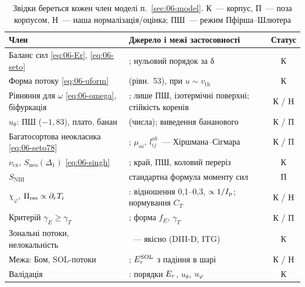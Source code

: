 \begin{table}[ht]
\centering\small
\caption{Звідки береться кожен член моделі п.~\ref{sec:06-model}. К~--- корпус, П~--- поза корпусом, Н~--- наша нормалізація/оцінка; ПШ~--- режим Пфірша--Шлютера}\label{tab:06-model}
\begin{tabularx}{\textwidth}{@{}p{4.1cm}Xc@{}}
\toprule
Член & Джерело і межі застосовності & Статус\\
\midrule
Баланс сил \eqref{eq:06-Er}, \eqref{eq:06-seto} & \cite{Seto2014,Singh2004,Ida2001}; нульовий порядок за δ & К\\
Форма потоку \eqref{eq:06-uform} & \cite{Seto2014} (рівн.~53), \cite{Sigmar1987} при $u\sim v_{\mathrm{th}}$ & К\\
Рівняння для $\omega$ \eqref{eq:06-omega}, біфуркація & \cite{Sigmar1987}; лише ПШ, ізотермічні поверхні; стійкість коренів & К / Н\\
$u_\theta$: ПШ ($-1{,}83$), плато, банан & \cite{Singh2004} (числа); виведення бананового & К / П\\
Багатосортова неокласика \eqref{eq:06-seto78} & \cite{Seto2014}; $\mu_{ai}$, $l^{ab}_{ij}$~--- Хіршмана--Сігмара & К / П\\
$\nu_{\mathrm{cx}}$, $S_{\mathrm{neo}}(\Delta_1)$ \eqref{eq:06-singh} & \cite{Singh2004}; край, ПШ, коловий переріз & К\\
$S_{\mathrm{NBI}}$ & стандартна формула моменту сил & П\\
$\chi_{\varphi}$, $\Pi_{\mathrm{res}}\propto\partial_rT_i$ & \cite{Ida2001}: відношення 0,1--0,3, $\propto1/I_{\mathrm{p}}$; нормування $C_T$ & К / Н\\
Критерій $\gamma_E\ge\gamma_T$ & \cite{Singh2004,Ida2001}; форма $f_E$, $\gamma_T$ & К / П\\
Зональні потоки, нелокальність & \cite{Wang2006}~--- якісно (DIII-D, ITG) & К\\
Межа: Бом, SOL-потоки & \cite{AhoMantila2011}; $E_{r}^{\mathrm{SOL}}$ з падіння в шарі & К / Н\\
Валідація & \cite{Ida2001,Singh2004,Wong1987}: порядки $E_{r}$, $u_\theta$, $u_{\varphi}$ & К\\
\bottomrule
\end{tabularx}
\end{table}

